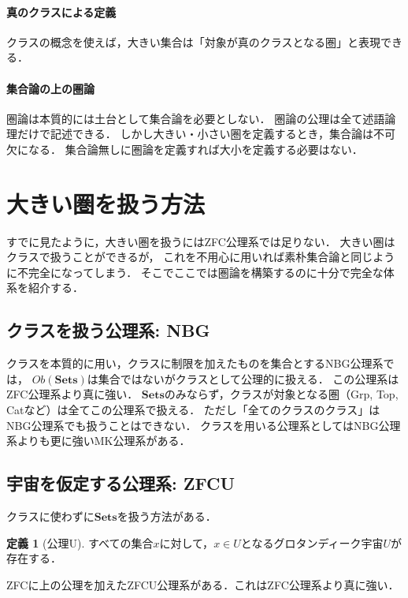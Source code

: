 \documentclass[a4j]{jarticle}
\theoremstyle{definition}
\newtheorem{definition}[theorem]{定義}
\begin{document}
        \paragraph{ 真のクラスによる定義 }
            クラスの概念を使えば，大きい集合は「対象が真のクラスとなる圏」と表現できる．

        \paragraph{ 集合論の上の圏論 }
            圏論は本質的には土台として集合論を必要としない．
            圏論の公理は全て述語論理だけで記述できる．
            しかし大きい・小さい圏を定義するとき，集合論は不可欠になる．
            集合論無しに圏論を定義すれば大小を定義する必要はない．

    \section{大きい圏を扱う方法}
        すでに見たように，大きい圏を扱うにはZFC公理系では足りない．
        大きい圏はクラスで扱うことができるが，
        これを不用心に用いれば素朴集合論と同じように不完全になってしまう．
        そこでここでは圏論を構築するのに十分で完全な体系を紹介する．

        \subsection{クラスを扱う公理系: NBG}
            クラスを本質的に用い，クラスに制限を加えたものを集合とするNBG公理系では，
            $Ob(\mathbf{Sets})$は集合ではないがクラスとして公理的に扱える．
            この公理系はZFC公理系より真に強い．
            $\mathbf{Sets}$のみならず，クラスが対象となる圏（Grp, Top, Catなど）は全てこの公理系で扱える．
            ただし「全てのクラスのクラス」はNBG公理系でも扱うことはできない．
            クラスを用いる公理系としてはNBG公理系よりも更に強いMK公理系がある．

        \subsection{宇宙を仮定する公理系: ZFCU}
            クラスに使わずに$\mathbf{Sets}$を扱う方法がある．

            \begin{definition}[公理U]
                すべての集合$x$に対して，$x \in  U$となるグロタンディーク宇宙$U$が存在する．
            \end{definition}
            ZFCに上の公理を加えたZFCU公理系がある．これはZFC公理系より真に強い．
\end{document}
